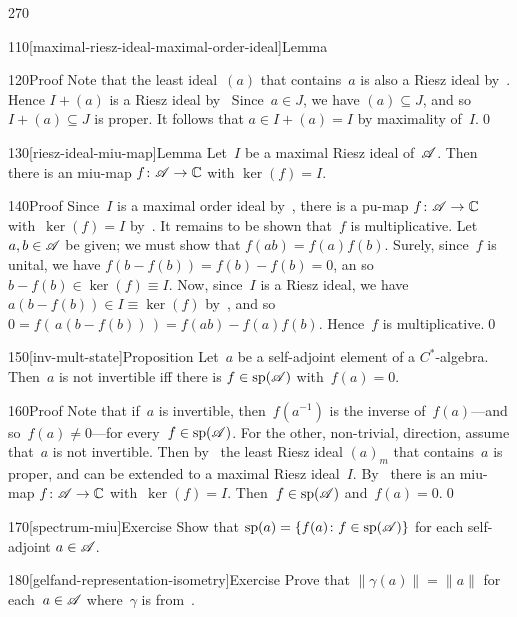 \begin{parsec}{270}
\begin{point}{110}[maximal-riesz-ideal-maximal-order-ideal]{Lemma}
\begin{point}{120}{Proof}
Note that the least ideal~$(a)$ that contains~$a$
is also a Riesz ideal by~.
Hence  $I+(a)$ is a Riesz ideal by~
Since~$a\in J$, we have $(a)\subseteq J$,
and so~$I+(a)\subseteq J$ is proper.
It follows that $a\in I+(a)=I$ by maximality of~$I$.\qed
\end{point}
\end{point}
\begin{point}{130}[riesz-ideal-miu-map]{Lemma}%
Let~$I$ be a maximal Riesz ideal of~$\mathscr{A}$.
Then there is an miu-map $f\colon \mathscr{A}\to \mathbb{C}$
with $\ker(f)=I$.
\begin{point}{140}{Proof}%
Since~$I$ is a maximal order ideal 
by~,
there is a pu-map $f\colon \mathscr{A}\to \mathbb{C}$
with~$\ker(f)=I$ by~.
It remains to be shown that~$f$ is multiplicative.
Let~$a,b\in \mathscr{A}$ be given;
we must show that $f(ab)=f(a)f(b)$.
Surely, since~$f$ is unital,
we have $f(b-f(b))=f(b)-f(b)=0$,
an so $b-f(b)\in \ker(f)\equiv I$.
Now, since~$I$ is a Riesz ideal,
we have $a(b-f(b))\in I\equiv \ker(f)$ by~,
and so~$0=f(\,a(b-f(b))\,)=f(ab)-f(a)f(b)$.
Hence~$f$ is multiplicative.\qed
\end{point}
\end{point}
\begin{point}{150}[inv-mult-state]{Proposition}%
Let~$a$ be a self-adjoint element of a $C^*$-algebra.
Then~$a$ is not invertible
iff there is $f\in\mathrm{sp}(\mathscr{A})$ 
with~$f(a)=0$.
\begin{point}{160}{Proof}%
Note that if~$a$ is invertible,
then~$f(a^{-1})$ is the inverse of~$f(a)$---and so~$f(a)\neq 0$---for 
every~$f\in\mathrm{sp}(\mathscr{A})$.
For the other, non-trivial, direction,
assume that~$a$ is not invertible.
Then 
by~
the least Riesz ideal $(a)_m$
that contains~$a$ is proper,
and can be extended to a maximal Riesz ideal~$I$.
By~
there is an miu-map $f\colon \mathscr{A}\to\mathbb{C}$
with~$\ker(f)=I$.
Then~$f\in\mathrm{sp}(\mathscr{A})$
and~$f(a)=0$.\qed
\end{point}
\end{point}
\begin{point}{170}[spectrum-miu]{Exercise}%
Show that $\mathrm{sp}(a)=\{f(a)\colon f\in\mathrm{sp}(\mathscr{A})\}$
for each self-adjoint $a\in\mathscr{A}$.
\end{point}
\begin{point}{180}[gelfand-representation-isometry]{Exercise}%
Prove that $\|\gamma(a)\|=\|a\|$
for each~$a\in\mathscr{A}$
where~$\gamma$ is from~.


\end{point}
\end{parsec}
